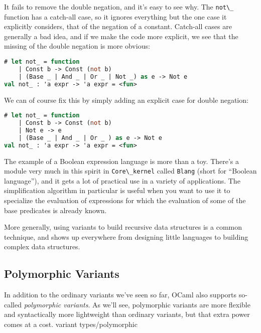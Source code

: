 It fails to remove the double negation, and it's easy to see why. The
\passthrough{\lstinline!not\_!} function has a catch-all case, so it
ignores everything but the one case it explicitly considers, that of the
negation of a constant. Catch-all cases are generally a bad idea, and if
we make the code more explicit, we see that the missing of the double
negation is more obvious:

\begin{lstlisting}[language=Caml]
# let not_ = function
    | Const b -> Const (not b)
    | (Base _ | And _ | Or _ | Not _) as e -> Not e
val not_ : 'a expr -> 'a expr = <fun>
\end{lstlisting}

We can of course fix this by simply adding an explicit case for double
negation:

\begin{lstlisting}[language=Caml]
# let not_ = function
    | Const b -> Const (not b)
    | Not e -> e
    | (Base _ | And _ | Or _ ) as e -> Not e
val not_ : 'a expr -> 'a expr = <fun>
\end{lstlisting}

The example of a Boolean expression language is more than a toy. There's
a module very much in this spirit in
\passthrough{\lstinline!Core\_kernel!} called
\passthrough{\lstinline!Blang!} (short for ``Boolean language''), and it
gets a lot of practical use in a variety of applications. The
simplification algorithm in particular is useful when you want to use it
to specialize the evaluation of expressions for which the evaluation of
some of the base predicates is already known.

More generally, using variants to build recursive data structures is a
common technique, and shows up everywhere from designing little
languages to building complex data structures.

\hypertarget{polymorphic-variants}{%
\subsection{Polymorphic Variants}\label{polymorphic-variants}}

In addition to the ordinary variants we've seen so far, OCaml also
supports so-called \emph{polymorphic variants}. As we'll see,
polymorphic variants are more flexible and syntactically more
lightweight than ordinary variants, but that extra power comes at a
cost. \protect\hypertarget{VARTYPpoly}{}{variant types/polymorphic}

